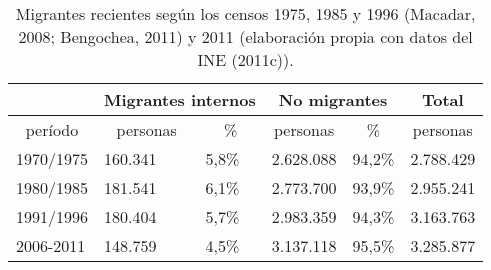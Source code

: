 \begin{table}[h]
    \centering
    \caption{Migrantes recientes según los censos 1975, 1985 y 1996 (Macadar, 2008; Bengochea, 2011) y 2011 (elaboración propia con datos del INE (2011c)).}
    \begin{tabular}{llllll}
    \hline
    \multicolumn{1}{c}{} & \multicolumn{2}{c}{Migrantes internos} & \multicolumn{2}{c}{No migrantes} & \multicolumn{1}{c}{Total} \\ \hline
    \multicolumn{1}{c}{perí­odo} & \multicolumn{1}{c}{personas} & \multicolumn{1}{c}{\%} & \multicolumn{1}{c}{personas} & \multicolumn{1}{c}{\%} & \multicolumn{1}{c}{personas} \\ \hline
    1970/1975 & 160.341 & 5,8\% & 2.628.088 & 94,2\% & 2.788.429 \\
    1980/1985 & 181.541 & 6,1\% & 2.773.700 & 93,9\% & 2.955.241 \\
    1991/1996 & 180.404 & 5,7\% & 2.983.359 & 94,3\% & 3.163.763 \\
    2006-2011 & 148.759 & 4,5\% & 3.137.118 & 95,5\% & 3.285.877 \\ \hline
    \end{tabular}
    \end{table}